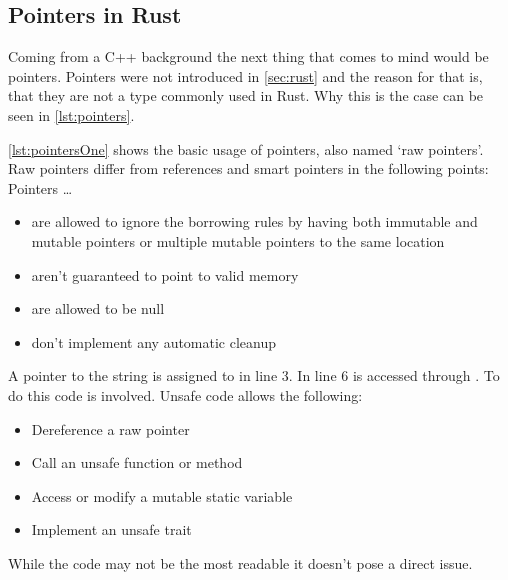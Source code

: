 \documentclass[thesis]{subfiles}
\begin{document}
  \subsection{Pointers in Rust}
    Coming from a C++ background the next thing that comes to mind would be pointers.
    Pointers were not introduced in \autoref{sec:rust} and the reason for that is, that they are not a type commonly used in Rust.
    Why this is the case can be seen in \autoref{lst:pointers}.

    \autoref{lst:pointersOne} shows the basic usage of pointers, also named `raw pointers'.
    Raw pointers differ from references and smart pointers in the following points\autocite{rust-book}: Pointers \ldots
    \begin{itemize}
      \item are allowed to ignore the borrowing rules by having both immutable and mutable pointers or multiple mutable pointers to the same location
      \item aren't guaranteed to point to valid memory
      \item are allowed to be null
      \item don’t implement any automatic cleanup
    \end{itemize}
    A pointer to the string  is assigned to  in line 3.
    In line 6  is accessed through .
    To do this  code is involved.
    Unsafe code allows the following\autocite{rust-book}:
    \begin{itemize}
      \item Dereference a raw pointer
      \item Call an unsafe function or method
      \item Access or modify a mutable static variable
      \item Implement an unsafe trait
    \end{itemize}
    While the code may not be the most readable it doesn't pose a direct issue.

    \newsavebox{\pointersOne}
    \begin{lrbox}{\pointersOne}%
      \begin{minipage}{.44\linewidth}
        
      \end{minipage}
    \end{lrbox}

    \newsavebox{\pointersTwo}
    \begin{lrbox}{\pointersTwo}
      \begin{minipage}{.49\linewidth}
        
      \end{minipage}
    \end{lrbox}
\end{document}
